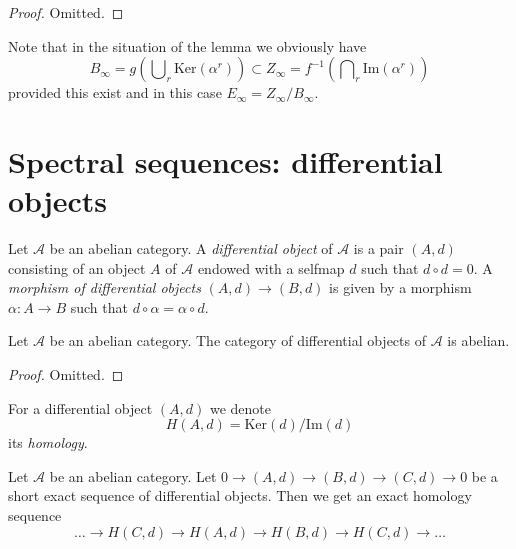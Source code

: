 \begin{proof}
Omitted.
\end{proof}

\noindent
Note that in the situation of the lemma we obviously have
$$
B_\infty = g\left(\bigcup\nolimits_r \text{Ker}(\alpha^r)\right)
\subset
Z_\infty = f^{-1}\left(\bigcap\nolimits_r \text{Im}(\alpha^r)\right)
$$
provided this exist and in this case $E_\infty = Z_\infty / B_\infty$.






\section{Spectral sequences: differential objects}
\label{section-differential-object}

\begin{definition}
\label{definition-differential-object}
Let $\mathcal{A}$ be an abelian category.
A {\it differential object} of $\mathcal{A}$
is a pair $(A, d)$ consisting of an
object $A$ of $\mathcal{A}$
endowed with a selfmap $d$ such that $d \circ d = 0$.
A {\it morphism of differential objects} $(A, d) \to (B, d)$
is given by a morphism $\alpha : A \to B$ such that
$d \circ \alpha = \alpha \circ d$.
\end{definition}

\begin{lemma}
\label{lemma-differential-objects-abelian}
Let $\mathcal{A}$ be an abelian category.
The category of differential objects of $\mathcal{A}$ is abelian.
\end{lemma}

\begin{proof}
Omitted.
\end{proof}

\begin{definition}
\label{definition-differential-object-homology}
For a differential object $(A, d)$ we denote
$$
H(A, d) = \text{Ker}(d)/\text{Im}(d)
$$
its {\it homology}.
\end{definition}

\begin{lemma}
\label{lemma-differential-objects-ses}
Let $\mathcal{A}$ be an abelian category.
Let $0 \to (A, d) \to (B, d) \to (C, d) \to 0$ be a short exact sequence
of differential objects. Then we get an exact homology sequence
$$
\ldots \to H(C, d) \to H(A, d) \to H(B, d) \to H(C, d) \to \ldots
$$
\end{lemma}

